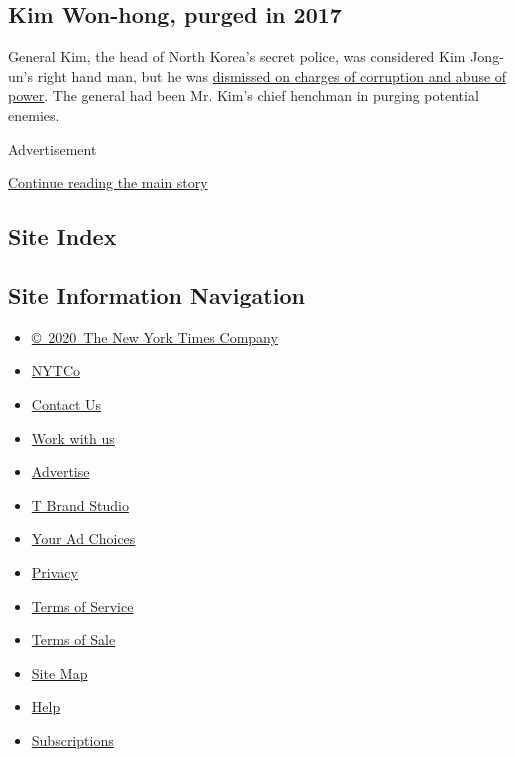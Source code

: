 \hypertarget{kim-won-hong-purged-in-2017}{%
\subsection{\texorpdfstring{\textbf{Kim Won-hong, purged in
2017}}{Kim Won-hong, purged in 2017}}\label{kim-won-hong-purged-in-2017}}

General Kim, the head of North Korea's secret police, was considered Kim
Jong-un's right hand man, but he was
\href{https://www.nytimes.com/2017/02/03/world/asia/north-korea-purge-kim-jong-un-kim-won-hong.html}{dismissed
on charges of corruption and abuse of power}. The general had been Mr.
Kim's chief henchman in purging potential enemies.

Advertisement

\protect\hyperlink{after-bottom}{Continue reading the main story}

\hypertarget{site-index}{%
\subsection{Site Index}\label{site-index}}

\hypertarget{site-information-navigation}{%
\subsection{Site Information
Navigation}\label{site-information-navigation}}

\begin{itemize}
\tightlist
\item
  \href{https://help.nytimes.com/hc/en-us/articles/115014792127-Copyright-notice}{©~2020~The
  New York Times Company}
\end{itemize}

\begin{itemize}
\tightlist
\item
  \href{https://www.nytco.com/}{NYTCo}
\item
  \href{https://help.nytimes.com/hc/en-us/articles/115015385887-Contact-Us}{Contact
  Us}
\item
  \href{https://www.nytco.com/careers/}{Work with us}
\item
  \href{https://nytmediakit.com/}{Advertise}
\item
  \href{http://www.tbrandstudio.com/}{T Brand Studio}
\item
  \href{https://www.nytimes.com/privacy/cookie-policy\#how-do-i-manage-trackers}{Your
  Ad Choices}
\item
  \href{https://www.nytimes.com/privacy}{Privacy}
\item
  \href{https://help.nytimes.com/hc/en-us/articles/115014893428-Terms-of-service}{Terms
  of Service}
\item
  \href{https://help.nytimes.com/hc/en-us/articles/115014893968-Terms-of-sale}{Terms
  of Sale}
\item
  \href{https://spiderbites.nytimes.com}{Site Map}
\item
  \href{https://help.nytimes.com/hc/en-us}{Help}
\item
  \href{https://www.nytimes.com/subscription?campaignId=37WXW}{Subscriptions}
\end{itemize}
